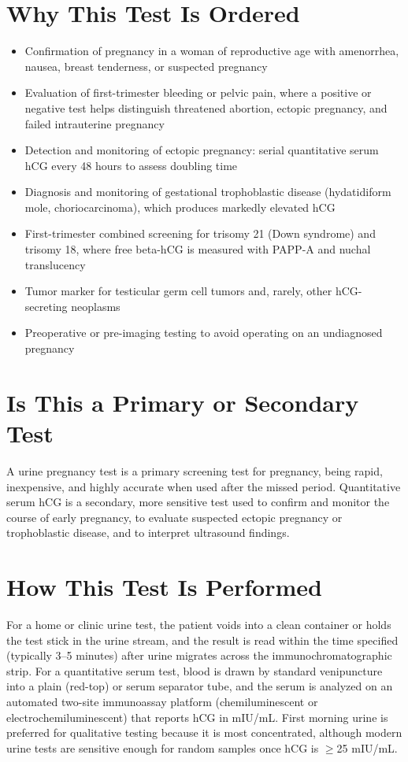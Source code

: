 \section*{Why This Test Is Ordered}
\begin{itemize}
  \item Confirmation of pregnancy in a woman of reproductive age with amenorrhea, nausea, breast tenderness, or suspected pregnancy
  \item Evaluation of first-trimester bleeding or pelvic pain, where a positive or negative test helps distinguish threatened abortion, ectopic pregnancy, and failed intrauterine pregnancy
  \item Detection and monitoring of ectopic pregnancy: serial quantitative serum hCG every 48 hours to assess doubling time
  \item Diagnosis and monitoring of gestational trophoblastic disease (hydatidiform mole, choriocarcinoma), which produces markedly elevated hCG
  \item First-trimester combined screening for trisomy 21 (Down syndrome) and trisomy 18, where free beta-hCG is measured with PAPP-A and nuchal translucency
  \item Tumor marker for testicular germ cell tumors and, rarely, other hCG-secreting neoplasms
  \item Preoperative or pre-imaging testing to avoid operating on an undiagnosed pregnancy
\end{itemize}
\section*{Is This a Primary or Secondary Test}
A urine pregnancy test is a primary screening test for pregnancy, being rapid, inexpensive, and highly accurate when used after the missed period. Quantitative serum hCG is a secondary, more sensitive test used to confirm and monitor the course of early pregnancy, to evaluate suspected ectopic pregnancy or trophoblastic disease, and to interpret ultrasound findings.
\section*{How This Test Is Performed}
For a home or clinic urine test, the patient voids into a clean container or holds the test stick in the urine stream, and the result is read within the time specified (typically 3--5 minutes) after urine migrates across the immunochromatographic strip. For a quantitative serum test, blood is drawn by standard venipuncture into a plain (red-top) or serum separator tube, and the serum is analyzed on an automated two-site immunoassay platform (chemiluminescent or electrochemiluminescent) that reports hCG in mIU/mL. First morning urine is preferred for qualitative testing because it is most concentrated, although modern urine tests are sensitive enough for random samples once hCG is $\geq$25 mIU/mL.
